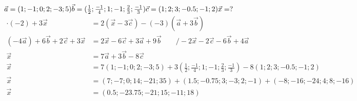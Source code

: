 \documentclass{article}
\begin{document}
\begin{math}
	\vec{a}=(1;-1;0;2;-3;5)\\
	\vec{b}=(\frac{1}{2};\frac{-1}{4};1;-1;\frac{2}{3};\frac{-1}{3})\\
	\vec{c}=(1;2;3;-0.5;-1;2)\\
	\vec{x}=?
\end{math}
\begin{align*}
	[(2\vec{a}-3\vec{b})-\vec{c}]\cdot(-2)+3\vec{x}&=
	2(\vec{x}-3\vec{c})-(-3)(\vec{a}+3\vec{b})\\
	(-4\vec{a})+6\vec{b}+2\vec{c}+3\vec{x}&=
	2\vec{x}-6\vec{c}+3\vec{a}+9\vec{b}
	\hspace{2em}/-2\vec{x}-2\vec{c}-6\vec{b}+4\vec{a}\\
	\vec{x}&=7\vec{a}+3\vec{b}-8\vec{c}\\
	\vec{x}&=7(1;-1;0;2;-3;5)
	+3(\frac{1}{2};\frac{-1}{4};1;-1;\frac{2}{3};\frac{-1}{3})
	-8(1;2;3;-0.5;-1;2)\\
	\vec{x}&=(7;-7;0;14;-21;35)+
	(1.5;-0.75;3;-3;2;-1)+
	(-8;-16;-24;4;8;-16)\\
	\vec{x}&=(0.5;-23.75;-21;15;-11;18)
\end{align*}	
\end{document}
